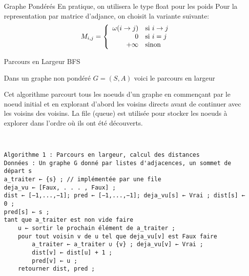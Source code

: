 \documentclass[a4paper,french,bookmarks]{article}
\begin{document}
    \begin{definition}{Graphe Pondérés}{}
        En pratique, on utilisera le type float pour les poids
        Pour la representation par matrice d'adjance, on choisit la variante suivante:
        \[ M_{i,j} = \left\lbrace\begin{array}{rl}
            \omega\!\left(i \to j\right) &\text{si } i \to j \\
            0 &\text{si } i = j\\
            +\infty &\text{sinon}
        \end{array}\right. \]
    
    \end{definition}


    \begin{definition}{Parcours en Largeur BFS}{}
    
        Dans un graphe non pondéré $G = (S,A)$ voici le parcours en largeur 
        
        Cet algorithme parcourt tous les noeuds d'un graphe en commençant par le noeud initial et en explorant d'abord les voisins directs avant de continuer avec les voisins des voisins. La file (queue) est utilisée pour stocker les noeuds à explorer dans l'ordre où ils ont été découverts.
        
        \\
        
        
        
        \begin{lstlisting}
Algorithme 1 : Parcours en largeur, calcul des distances
Données : Un graphe G donné par listes d'adjacences, un sommet de départ s
a_traiter ← {s} ; // implémentée par une file
deja_vu ← [Faux, . . . , Faux] ;
dist ← [−1,...,−1]; pred ← [−1,...,−1]; deja_vu[s] ← Vrai ; dist[s] ← 0 ;
pred[s] ← s ;
tant que a_traiter est non vide faire
    u ← sortir le prochain élément de a_traiter ;
    pour tout voisin v de u tel que deja_vu[v] est Faux faire
        a_traiter ← a_traiter ∪ {v} ; deja_vu[v] ← Vrai ;
        dist[v] ← dist[u] + 1 ;
        pred[v] ← u ;
    retourner dist, pred ;
        \end{lstlisting}
        
        


    \end{definition}
\end{document}
